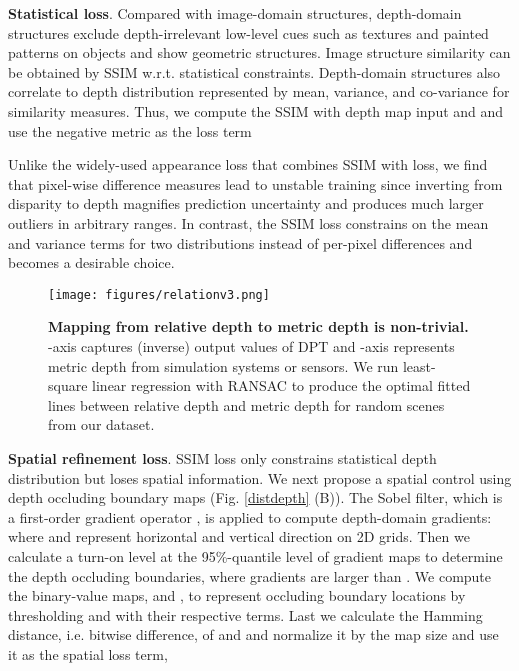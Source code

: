 \documentclass[10pt,twocolumn,letterpaper]{article}
\begin{document}
\textbf{Statistical loss}. Compared with image-domain structures, depth-domain structures exclude depth-irrelevant low-level cues such as textures and painted patterns on objects and show geometric structures. Image structure similarity can be obtained by SSIM \cite{wang2002universal,wang2004image,wang2003multiscale} w.r.t. statistical constraints. Depth-domain structures also correlate to depth distribution represented by mean, variance, and co-variance for similarity measures. Thus, we compute the SSIM with depth map input  and  and use the negative metric as the loss term 

Unlike the widely-used appearance loss that combines SSIM with  loss, we find that pixel-wise difference measures lead to unstable training since inverting from disparity to depth magnifies prediction uncertainty and produces much larger outliers in arbitrary ranges. In contrast, the SSIM loss constrains on the mean and variance terms for two distributions instead of per-pixel differences and becomes a desirable choice.

\begin{figure}[bt!]
    \centering
    \texttt{[image: figures/relationv3.png]}
    \vspace{-12pt}
    \caption{\textbf{Mapping from relative depth to metric depth is non-trivial.} -axis captures (inverse) output values of DPT and -axis represents metric depth from simulation systems or sensors. We run least-square linear regression with RANSAC to produce the optimal fitted lines between relative depth and metric depth for random scenes from our dataset.}
    \vspace{-8pt}
    \label{relation}
\end{figure}

\textbf{Spatial refinement loss}. SSIM loss only constrains statistical depth distribution but loses spatial information. We next propose a spatial control using depth occluding boundary maps (Fig. \ref{distdepth} (B)). The Sobel filter, which is a first-order gradient operator \cite{kanopoulos1988design}, is applied to compute depth-domain gradients:  where  and  represent horizontal and vertical direction on 2D grids. Then we calculate a turn-on level  at the 95\%-quantile level of gradient maps to determine the depth occluding boundaries, where gradients are larger than . We compute the  binary-value maps,  and , to represent occluding boundary locations by thresholding  and  with their respective  terms. Last we calculate the Hamming distance, i.e. bitwise difference, of  and  and normalize it by the map size and use it as the spatial loss term,
\end{document}
